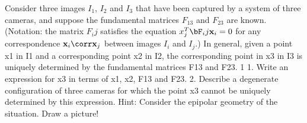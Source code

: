 \begin{problem}
  Consider three images $I_1$, $I_2$ and $I_3$ that have been captured
  by a system of three cameras, and suppose the fundamental matrices
  $F_13$ and $F_23$ are known. (Notation: the matrix $F_ij$ satisfies the
  equation $x_j^T \bF_ij \bx_i = 0$ for any correspondence
  $\bx_i \corr \bx_j$ between images $I_i$ and $I_j$.)
  In general, given a point x1 in I1 and a corresponding point x2 in I2, the corresponding
point in x3 in I3 is uniquely determined by the fundamental matrices F13 and F23.
1
1. Write an expression for x3 in terms of x1, x2, F13 and F23.
2. Describe a degenerate configuration of three cameras for which the point x3 cannot be
uniquely determined by this expression.
Hint: Consider the epipolar geometry of the situation. Draw a picture!
\end{problem}
